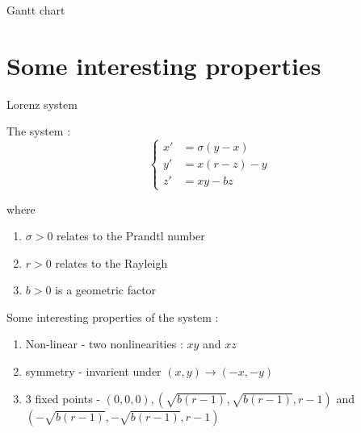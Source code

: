 \documentclass[10pt,xcolor={table,dvipsnames},t]{beamer}
\begin{document}
	\begin{frame}{Gantt chart}
		
		
	\end{frame}
	
	\section{Some interesting properties}
	
	\begin{frame}[allowframebreaks]{Lorenz system}
		
		The system :
		$$\left\{\begin{aligned} 
			x'&=\sigma(y-x) \\
			y'&=x(r-z)-y \\
			z'&=xy-bz
		\end{aligned}\right.$$
	
		where
		
		\begin{enumerate}[\textbullet]
			\item $\sigma > 0$  relates to the Prandtl number
			\item $r > 0$  relates to the Rayleigh
			\item $b > 0$ is a geometric factor
		\end{enumerate}
	
		\newpage 
		
		Some interesting properties of the system :
		
		\begin{enumerate}[\textbullet]
			\item Non-linear - two nonlinearities : $xy$ and $xz$
			\item symmetry - invarient under $(x,y)\rightarrow(-x,-y) $
			\item 3 fixed points - $(0,0,0) ,(\sqrt{b(r-1)},\sqrt{b(r-1)},r-1)$ and $(-\sqrt{b(r-1)},-\sqrt{b(r-1)},r-1)$
		\end{enumerate}
		
	\end{frame}
	
\end{document}
